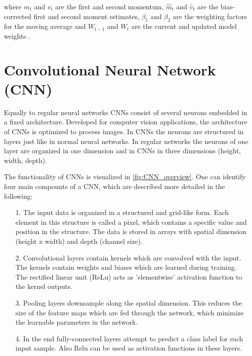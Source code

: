 where $m_{t}$ and $v_{t}$ are the first and second momentum, $\hat{m}_{t}$ and $\hat{v}_{t}$ are the bias-corrected first and second moment estimates, $\beta_{1}$ and $\beta_{2}$ are the weighting factors for the moving average and $W_{t-1}$ and  $W_{t}$ are the current and updated model weights \cite{Ruder2016}.

\section{Convolutional Neural Network (CNN)}

Equally to regular neural networks CNNs consist of several neurons embedded in a fixed architecture. Developed for computer vision applications, the architecture of CNNs is optimized to process images. In CNNs the neurons are structured in layers just like in normal neural networks. In regular networks the neurons of one layer are organized in one dimension and in CNNs in three dimensions (height, width, depth).

The functionality of CNNs is visualized in \ref{fig:CNN_overview}. One can identify four main compounts of a CNN, which are described more detailed in the following:

\begin{itemize}
    \item [1.] The input data is organized in a structured and grid-like form. Each element in this structure is called a pixel, which contains a specific value and position in the structure. The data is stored in arrays with spatial dimension (height x width) and depth (channel size).
    
    \item [2.] Convolutional layers contain kernels which are convolved with the input. The kernels contain weights and biases which are learned during training. The rectified linear unit (ReLu) acts as ’elementwise’ activation function to the kernel outputs.
    
    \item [3.]  Pooling layers downsample along the spatial dimension. This reduces the size of the feature maps which are fed through the network, which minimize the learnable parameters in the network.
    
    \item [4.] In the end fully-connected layers attempt to predict a class label for each input sample. Also Relu can be used as activation functions in these layers.
\end{itemize}

